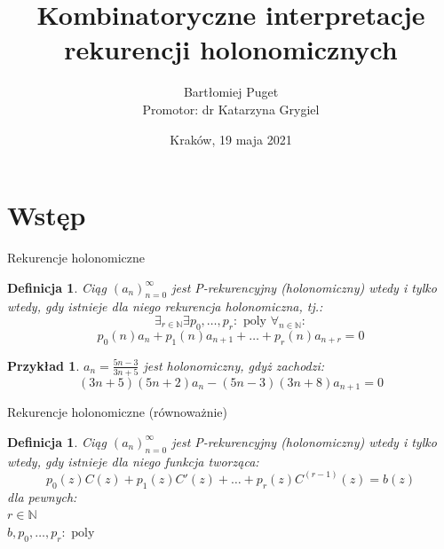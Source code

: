 \documentclass[final]{beamer}
\title{Kombinatoryczne interpretacje rekurencji holonomicznych}
\author[Bartłomiej Puget (TCS UJ)]{Bartłomiej Puget\\Promotor: dr Katarzyna Grygiel}
\institute{Theoretical Computer Science\\Jagiellonian University}
\date{Kraków, 19 maja 2021}
\theoremstyle{bluetheorem}
\theoremstyle{bluetheorem}
\newtheorem{mydefinition}[mytheorem]{Definicja}
\theoremstyle{greentheorem}
\newtheorem{myexample}[mytheorem]{Przykład}
\begin{document}
\maketitle

\section{Wstęp}

\begin{frame}{Rekurencje holonomiczne}
    \begin{mydefinition}
        Ciąg \((a_n)_{n=0}^\infty\) jest P-rekurencyjny (holonomiczny) wtedy i tylko wtedy, gdy istnieje dla niego rekurencja holonomiczna, tj.:
        \[\exists_{r \in \mathbb{N}} \exists {p_0, \ldots, p_r : \text{ poly }}\forall_{n \in \mathbb{N}}:\]
        \[p_0(n) a_n + p_1(n) a_{n + 1} + \ldots + p_r(n) a_{n + r} = 0\]
    \end{mydefinition}

    \begin{myexample}
        \(a_n = \frac{5 n - 3}{3 n + 5}\) jest holonomiczny, gdyż zachodzi:
        \[(3n + 5) (5n + 2) a_n - (5n - 3)(3n + 8) a_{n + 1} = 0\]
    \end{myexample}
\end{frame}

\begin{frame}{Rekurencje holonomiczne (równoważnie)}
    \begin{mydefinition}
        Ciąg \((a_n)_{n=0}^\infty\) jest P-rekurencyjny (holonomiczny) wtedy i tylko wtedy, gdy istnieje dla niego funkcja tworząca:
        \[p_0(z) C(z) + p_1(z) C'(z) + \ldots + p_r(z) C^{(r - 1)}(z) = b(z)\]
        dla pewnych:\\
        \(r \in \mathbb{N}\)\\
        \(b, p_0, \ldots, p_r : \text{ poly }\)
    \end{mydefinition}
\end{frame}
\end{document}
